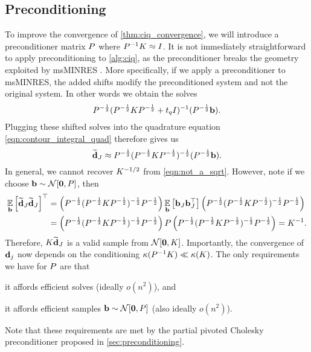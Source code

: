 \subsection{Preconditioning}
\label{sec:ciq_precond}

To improve the convergence of \cref{thm:ciq_convergence}, we will introduce a preconditioner matrix $P$ where $P^{-1} K \approx I$.
It is not immediately straightforward to apply preconditioning to \cref{alg:ciq}, as the preconditioner breaks the geometry exploited by msMINRES \cite{jegerlehner1996krylov,aune2013iterative}.
More specifically, if we apply a preconditioner to msMINRES, the added shifts modify the preconditioned system and not the original system.
In other words we obtain the solves
%
\begin{equation*}
	P^{-\frac 1 2} (P^{-\frac 1 2} K P^{-\frac 1 2} + t_q I)^{-1} (P^{-\frac 1 2} \mathbf{b}).
\end{equation*}
%
Plugging these shifted solves into the quadrature equation \cref{eqn:contour_integral_quad} therefore gives us
%
\begin{equation}
	\widetilde {\mathbf{d}}_J \approx P^{-\frac 1 2} (P^{-\frac 1 2} K P^{-\frac 1 2})^{-\frac 1 2} (P^{-\frac 1 2} \mathbf{b}).
  \label{eqn:not_a_sqrt}
\end{equation}
%
In general, we cannot recover $K^{-1/2}$ from \cref{eqn:not_a_sqrt}.
However, note if  we choose $\bb \sim \normaldist{\bzero}{\bP}$, then
%
\begin{align*}
	\operatorname*{\mathbb{E}}_{\mathbf{b}} \left[ \widetilde {\mathbf{d}}_J \widetilde {\mathbf{d}}_J \right]^\top
	&=
	\left( P^{-\frac 1 2} (P^{-\frac 1 2} K P^{-\frac 1 2})^{-\frac 1 2} P^{-\frac 1 2} \right)
	\operatorname*{\mathbb{E}}_{\mathbf{b}} \left[  \mathbf{b}_J \mathbf{b}_J^\top \right]
	\left( P^{-\frac 1 2} (P^{-\frac 1 2} K P^{-\frac 1 2})^{-\frac 1 2} P^{-\frac 1 2} \right)
	\\
	&=
	\left( P^{-\frac 1 2} (P^{-\frac 1 2} K P^{-\frac 1 2})^{-\frac 1 2} P^{-\frac 1 2} \right)
	P
	\left( P^{-\frac 1 2} (P^{-\frac 1 2} K P^{-\frac 1 2})^{-\frac 1 2} P^{-\frac 1 2} \right)
	=
	K^{-1}.
\end{align*}
%
Therefore, $K \widetilde {\mathbf{d}}_J$ is a valid sample from $\normaldist{\bzero}{\bK}$.
Importantly, the convergence of $\mathbf{d}_j$ now depends on the conditioning $\kappa(P^{-1} K) \ll \kappa(K)$.
The only requirements we have for $P$ are that
\begin{enumerate*}
	\item it affords efficient solves (ideally $o(n^2)$), and
	\item it affords efficient samples $\bb \sim \normaldist{\bzero}{\bP}$ (also ideally $o(n^2)$).
\end{enumerate*}
%
Note that these requirements are met by the partial pivoted Cholesky preconditioner proposed in \cref{sec:preconditioning}.

